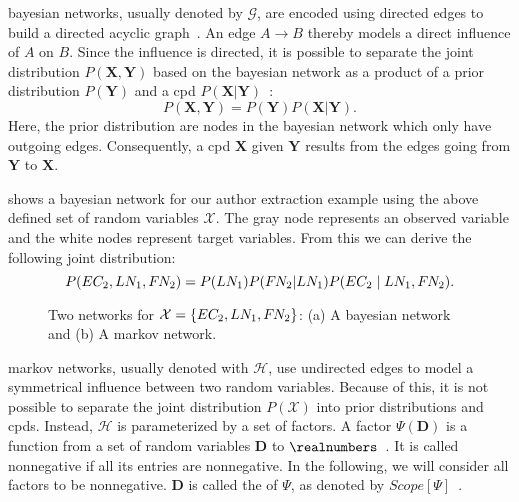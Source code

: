 \Glspl{bayesian network}, usually denoted by $\mathcal{G}$, are encoded using directed \glspl{edge} to build a directed acyclic graph~\citep{koller2009probabilistic}.
An \gls{edge} $A\to B$ thereby models a direct influence of $A$ on $B$.
Since the influence is directed, it is possible to separate the \gls{joint distribution} $P(\mathbf{X},\mathbf{Y})$ based on the \gls{bayesian network} as a product of a \gls{prior distribution} $P(\mathbf{Y})$ and a \gls{cpd} $P(\mathbf{X}|\mathbf{Y})$~\citep{sutton2010introduction}:
\begin{equation}
  P(\mathbf{X},\mathbf{Y})=P(\mathbf{Y})P(\mathbf{X}|\mathbf{Y}).
\end{equation}
Here, the \gls{prior distribution} are \glspl{node} in the \gls{bayesian network} which only have outgoing \glspl{edge}.
Consequently, a \gls{cpd} $\mathbf{X}$ given $\mathbf{Y}$ results from the \glspl{edge} going from $\mathbf{Y}$ to $\mathbf{X}$.

 shows a \gls{bayesian network} for our author extraction example using the above defined set of \glspl{random variable} $\mathcal{X}$.
The gray node represents an \gls{observed variable} and the white nodes represent \glspl{target variable}.
From this we can derive the following \gls{joint distribution}:
\begin{equation*}
  P(EC_2,LN_1,F\hspace{-0.07em} N_2)=P(LN_1)P(F\hspace{-0.07em} N_2|LN_1)P(EC_2\mid LN_1,F\hspace{-0.07em} N_2).
\end{equation*}

\begin{figure}[t]
\centering

\caption[Two networks for $\mathcal{X}=\{EC_2,LN_1,F\rs N_2\}$]{%
  Two networks for $\mathcal{X}=\{EC_2,LN_1,F\rs N_2\}$:
  (a) A \gls{bayesian network} and (b) A \gls{markov network}.
}
\label{fig:example-networks}
\end{figure}

\bigskip

\Glspl{markov network}, usually denoted with $\mathcal{H}$, use undirected \glspl{edge} to model a symmetrical influence between two \glspl{random variable}.
Because of this, it is not possible to separate the \gls{joint distribution} $P(\mathcal{X})$ into \glspl{prior distribution} and \glspl{cpd}.
Instead, $\mathcal{H}$ is parameterized by a set of \glspl{factor}.
A \gls{factor} $\Psi(\mathbf{D})$ is a function from a set of \glspl{random variable} $\mathbf{D}$ to $\realnumbers$~\citep{koller2009probabilistic}.
It is called nonnegative if all its entries are nonnegative.
In the following, we will consider all factors to be nonnegative.
$\mathbf{D}$ is called the  of $\Psi$, as denoted by $Scope[\Psi]$~\citep{koller2009probabilistic}.

